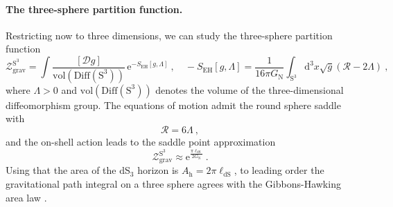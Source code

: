\documentclass[12pt,a4paper]{article}
\newcommand{\be}{\begin{equation}}
\newcommand{\ee}{\end{equation}}
\renewcommand\d{\text{d}}
\begin{document}
\paragraph{The three-sphere partition function.}
Restricting now to three dimensions, we can study the three-sphere partition function
\begin{equation}
 \mathcal{Z}_{\mathrm{grav}}^{\text{S}^3} = \int \frac{[\mathcal{D}g]}{\mathrm{vol}(\text{Diff}(\mathrm{S}^3))}\, \mathrm{e}^{- S_{\mathrm{EH}}[g,\Lambda]}~,\quad -S_{\mathrm{EH}}[g,\Lambda] =\frac{1}{16\pi G_{\text{N}}}\int_{\text{S}^3} \d^3x\sqrt{g}\left(\mathcal{R}- 2\Lambda\right)~,
\end{equation}
where $\Lambda>0$ and $\mathrm{vol}(\text{Diff}(\mathrm{S}^3))$ denotes the volume of the three-dimensional diffeomorphism group. The equations of motion admit the round sphere saddle with
\begin{equation}
 \mathcal{R} = 6\Lambda~,
\end{equation}
 and the on-shell action leads to the saddle point approximation
 \be 
\mathcal{Z}_{\mathrm{grav}}^{\text{S}^3} \approx \mathrm{e}^{\frac{\pi \ell_{\mathrm{dS}}}{2G_{\text{N}}}}~. \label{eq: gravity PI}
\ee
Using that the area of the dS$_3$ horizon is $A_{\text{h}} = 2\pi \ell_{\mathrm{dS}}$, to leading order the gravitational path integral on a three sphere agrees with the Gibbons-Hawking area law \cite{Gibbons:1976ue, Gibbons:1977mu}.
\end{document}
